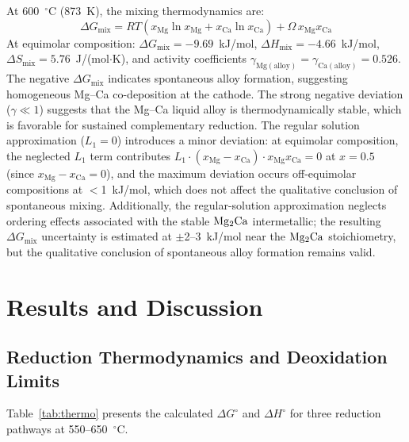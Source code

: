 \documentclass[sn-mathphys,Numbered]{sn-jnl}
\begin{document}
At 600~$^{\circ}$C (873~K), the mixing thermodynamics are:
\begin{equation}
\label{eq:mix}
\Delta G_{\mathrm{mix}} = RT(x_{\mathrm{Mg}}\ln x_{\mathrm{Mg}} + x_{\mathrm{Ca}}\ln x_{\mathrm{Ca}}) + \Omega\,x_{\mathrm{Mg}}x_{\mathrm{Ca}}
\end{equation}
At equimolar composition: $\Delta G_{\mathrm{mix}} = -9.69$~kJ/mol, $\Delta H_{\mathrm{mix}} = -4.66$~kJ/mol, $\Delta S_{\mathrm{mix}} = 5.76$~J/(mol$\cdot$K), and activity coefficients $\gamma_{\mathrm{Mg(alloy)}} = \gamma_{\mathrm{Ca(alloy)}} = 0.526$. The negative $\Delta G_{\mathrm{mix}}$ indicates spontaneous alloy formation, suggesting homogeneous Mg--Ca co-deposition at the cathode. The strong negative deviation ($\gamma \ll 1$) suggests that the Mg--Ca liquid alloy is thermodynamically stable, which is favorable for sustained complementary reduction. The regular solution approximation ($L_1 = 0$) introduces a minor deviation: at equimolar composition, the neglected $L_1$ term contributes $L_1 \cdot (x_{\mathrm{Mg}} - x_{\mathrm{Ca}}) \cdot x_{\mathrm{Mg}} x_{\mathrm{Ca}} = 0$ at $x = 0.5$ (since $x_{\mathrm{Mg}} - x_{\mathrm{Ca}} = 0$), and the maximum deviation occurs off-equimolar compositions at $<$1~kJ/mol, which does not affect the qualitative conclusion of spontaneous mixing. Additionally, the regular-solution approximation neglects ordering effects associated with the stable $\ce{Mg2Ca}$ intermetallic; the resulting $\Delta G_{\mathrm{mix}}$ uncertainty is estimated at $\pm$2--3~kJ/mol near the $\ce{Mg2Ca}$ stoichiometry, but the qualitative conclusion of spontaneous alloy formation remains valid.

\section{Results and Discussion}

\subsection{Reduction Thermodynamics and Deoxidation Limits}

Table~\ref{tab:thermo} presents the calculated $\Delta G^{\circ}$ and $\Delta H^{\circ}$ for three reduction pathways at 550--650~$^{\circ}$C.
\end{document}
